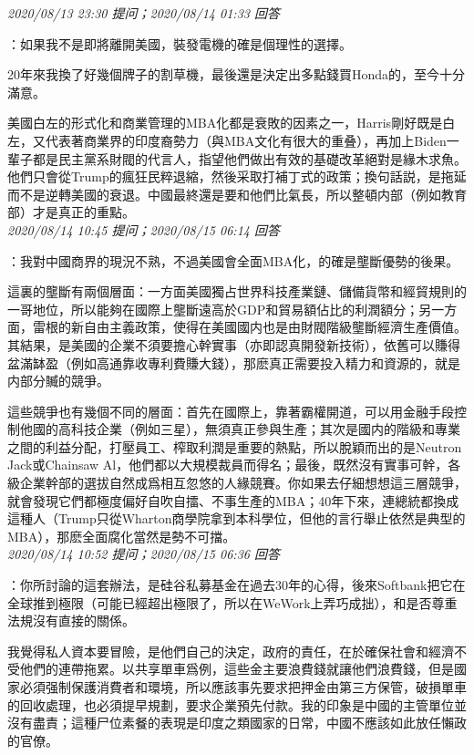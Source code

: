 \documentclass[twocolumn]{ctexart}
\begin{document}
\textit{\hfill\noindent\small 2020/08/13 23:30 提问；2020/08/14 01:33 回答}

：如果我不是即將離開美國，裝發電機的確是個理性的選擇。

20年來我換了好幾個牌子的割草機，最後還是決定出多點錢買Honda的，至今十分滿意。

美國白左的形式化和商業管理的MBA化都是衰敗的因素之一，Harris剛好既是白左，又代表著商業界的印度裔勢力（與MBA文化有很大的重叠），再加上Biden一輩子都是民主黨系財閥的代言人，指望他們做出有效的基礎改革絕對是緣木求魚。他們只會從Trump的瘋狂民粹退縮，然後采取打補丁式的政策；換句話説，是拖延而不是逆轉美國的衰退。中國最終還是要和他們比氣長，所以整頓内部（例如教育部）才是真正的重點。
\\

\textit{\hfill\noindent\small 2020/08/14 10:45 提问；2020/08/15 06:14 回答}

：我對中國商界的現況不熟，不過美國會全面MBA化，的確是壟斷優勢的後果。

這裏的壟斷有兩個層面：一方面美國獨占世界科技產業鏈、儲備貨幣和經貿規則的一哥地位，所以能夠在國際上壟斷遠高於GDP和貿易額佔比的利潤額分；另一方面，雷根的新自由主義政策，使得在美國國内也是由財閥階級壟斷經濟生產價值。其結果，是美國的企業不須要擔心幹實事（亦即認真開發新技術），依舊可以賺得盆滿缽盈（例如高通靠收專利費賺大錢），那麽真正需要投入精力和資源的，就是内部分贓的競爭。

這些競爭也有幾個不同的層面：首先在國際上，靠著霸權開道，可以用金融手段控制他國的高科技企業（例如三星），無須真正參與生產；其次是國内的階級和專業之間的利益分配，打壓員工、榨取利潤是重要的熱點，所以脫穎而出的是Neutron Jack或Chainsaw Al，他們都以大規模裁員而得名；最後，既然沒有實事可幹，各級企業幹部的選拔自然成爲相互忽悠的人緣競賽。你如果去仔細想想這三層競爭，就會發現它們都極度偏好自吹自擂、不事生產的MBA；40年下來，連總統都換成這種人（Trump只從Wharton商學院拿到本科學位，但他的言行舉止依然是典型的MBA），那麽全面腐化當然是勢不可擋。
\\

\textit{\hfill\noindent\small 2020/08/14 10:52 提问；2020/08/15 06:36 回答}

：你所討論的這套辦法，是硅谷私募基金在過去30年的心得，後來Softbank把它在全球推到極限（可能已經超出極限了，所以在WeWork上弄巧成拙），和是否尊重法規沒有直接的關係。

我覺得私人資本要冒險，是他們自己的決定，政府的責任，在於確保社會和經濟不受他們的連帶拖累。以共享單車爲例，這些金主要浪費錢就讓他們浪費錢，但是國家必須强制保護消費者和環境，所以應該事先要求把押金由第三方保管，破損單車的回收處理，也必須提早規劃，要求企業預先付款。我的印象是中國的主管單位並沒有盡責；這種尸位素餐的表現是印度之類國家的日常，中國不應該如此放任懶政的官僚。
\\
\end{document}
